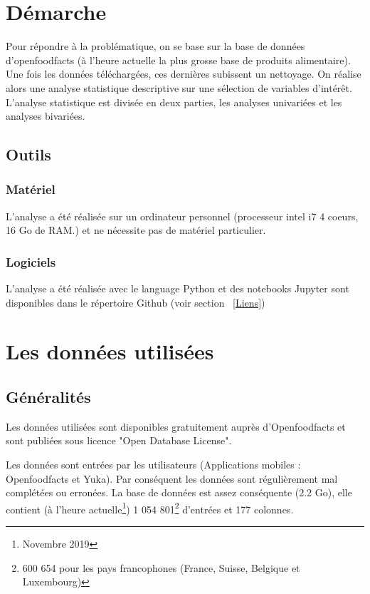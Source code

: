 \section{Démarche}

  Pour répondre à la problématique, on se base sur la base de données
  d'openfoodfacts (à l'heure actuelle la plus grosse base de produits alimentaire).
  Une fois les données téléchargées, ces dernières subissent un nettoyage.
  On réalise alors une analyse statistique descriptive
  sur une sélection de variables d'intérêt.
  L'analyse statistique est divisée en deux parties, les analyses univariées et
  les analyses bivariées.

  \subsection{Outils}

    \subsubsection{Matériel}

    L'analyse a été réalisée sur un ordinateur personnel
    (processeur intel i7 4 coeurs, 16 Go de RAM.) et ne nécessite pas de
    matériel particulier.

    \subsubsection{Logiciels}

    L'analyse a été réalisée avec le language Python et des notebooks Jupyter
    sont disponibles dans le répertoire Github (voir section ~\ref{Liens})

\section{Les données utilisées}

  \subsection{Généralités}

  Les données utilisées sont disponibles gratuitement auprès d'Openfoodfacts et
  sont publiées sous licence "Open Database License".

  Les données sont entrées par les utilisateurs (Applications mobiles :
  Openfoodfacts et Yuka). Par conséquent les données sont régulièrement mal
  complétées ou erronées.
  La base de données est assez conséquente (2.2 Go), elle contient (à l'heure
  actuelle\footnote{Novembre 2019}) 1 054 801\footnote{600 654 pour les pays francophones (France,
  Suisse, Belgique et Luxembourg)} d'entrées et 177 colonnes.

